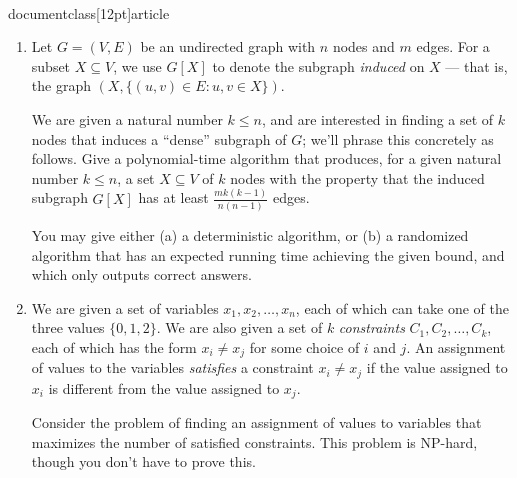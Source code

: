 \\documentclass[12pt]{article}
\begin{document}
\begin{enumerate}


\item 

Let $G = (V,E)$ be an undirected graph with $n$ nodes
and $m$ edges.
For a subset $X \subseteq V$, we use
$G[X]$ to denote the subgraph {\em induced} on $X$ ---
that is, the graph $(X,\{(u,v) \in E: u, v \in X\})$.

We are given a natural number $k \leq n$, and
are interested in finding a set of $k$ nodes
that induces a ``dense'' subgraph of $G$;
we'll phrase this concretely as follows.
Give a polynomial-time algorithm that produces,
for a given natural number $k \leq n$,
a set $X \subseteq V$ of $k$ nodes with the property
that the induced subgraph $G[X]$
has at least
$\frac{m k (k-1)}{n (n-1)}$
edges.

You may give either (a) a deterministic algorithm,
or (b) a randomized algorithm that has an expected running time
achieving the given bound, and which only outputs correct answers.




\item 

We are given a set of variables $x_1, x_2, \ldots, x_n$,
each of which can take one of the three values $\{0, 1, 2\}$.
We are also given a set of $k$ {\em constraints} $C_1, C_2, \ldots, C_k$,
each of which has the form $x_i \neq x_j$
for some choice of $i$ and $j$.
An assignment of values to the variables
{\em satisfies} a constraint $x_i \neq x_j$ if
the value assigned to $x_i$ is different from the
value assigned to $x_j$.

Consider the problem of finding an assignment of values
to variables that maximizes the number of satisfied constraints.
This problem is NP-hard, though you don't have to prove this.


\end{enumerate}
\end{document}
